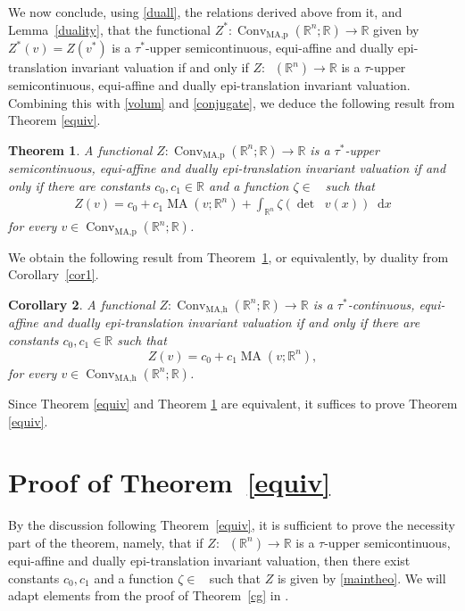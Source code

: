\documentclass[11pt]{article}
\newtheorem{teo}{Theorem}
\newtheorem{cor}[teo]{Corollary}
\theoremstyle{definition} %
\newcommand{\dif}{\mathop{}\!\mathrm{d}}
\newcommand{\RR}{(\mathbb{R}^n)}
\DeclareMathOperator{\Conv}{Conv}
\DeclareMathOperator{\MA}{MA}
\DeclareMathOperator{\MAh}{MA,h}
\DeclareMathOperator{\MAp}{MA,p}
\DeclareMathOperator{\D}{D^2}
\DeclareMathOperator{\LP}{Conv_{lp}}
\newcommand{\finite}{(\mathbb{R}^n; \mathbb{R})}
\DeclareMathOperator{\conc}{Conc([0,\infty))}
\begin{document}
We now conclude, using \eqref{duall}, the relations derived above from it, and Lemma~\ref{duality},  that the functional  $Z^*: \Conv_{\MAp}\finite\rightarrow\mathbb{R}$ given by $Z^*(v)= Z(v^*)$ is a $\tau^*$-upper semicontinuous, equi-affine   and dually epi-translation invariant valuation if and only if $Z: \LP\RR\rightarrow\mathbb{R}$  is a $\tau$-upper semicontinuous, equi-affine    and dually epi-translation invariant valuation.  Combining this with \eqref{volum} and  \eqref{conjugate},  we deduce the following result from Theorem \ref{equiv}.



\begin{teo}\label{maintheorem}
A functional  $Z:\Conv_{\MAp}\finite\rightarrow\mathbb{R}$ is  a $\tau^*$-upper semicontinuous, equi-affine  and dually epi-translation invariant valuation  if and only if there are constants $c_0,c_1\in\mathbb{R}$ and a  function   $\zeta\in\conc$ such that
\begin{align*}
Z(v)= c_0+c_1\MA(v;\mathbb{R}^n)+\int_{\mathbb{R}^n}\zeta(\det \D v(x))\dif x
\end{align*}
for every $v\in \Conv_{\MAp}\finite$.
\end{teo}


We obtain the following result from Theorem~\ref{maintheorem}, or equivalently, by duality from Corollary~\ref{cor1}.



\begin{cor}
A functional  $Z:\Conv_{\MAh}\finite\rightarrow\mathbb{R}$ is a $\tau^*$-continuous, equi-affine and dually epi-translation  invariant valuation if and only if there are constants $c_0,c_1\in\mathbb{R}$ such that
$$Z(v)=c_0+c_1\MA(v;\mathbb{R}^n),$$ 
for every $v\in \Conv_{\MAh}\finite$.
\end{cor}


Since Theorem \ref{equiv} and Theorem \ref{maintheorem} are equivalent, it suffices to prove  Theorem \ref{equiv}.




\section{Proof of Theorem~\ref{equiv}}\label{Proof of the Theorem}

By the discussion following Theorem~\ref{equiv},  it is sufficient   to prove the necessity part of the theorem, namely, that if $Z: \LP\RR\rightarrow \mathbb{R}$ is a $\tau$-upper semicontinuous,  equi-affine  and dually epi-translation invariant valuation, then there exist constants $c_0,c_1$ and a function $\zeta\in\conc$ such that $Z$ is given by \eqref{maintheo}.  We will adapt elements from the proof of Theorem~\ref{cg} in \cite{ludwig1999characterization}. 
\end{document}
